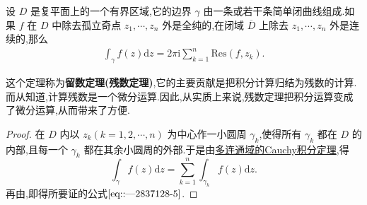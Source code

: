\documentclass[../../main.tex]{subfiles}
\begin{document}
\begin{theorem}\label{theorem:留数定理(残数定理)-定理5.4.9}
设 \( D \) 是复平面上的一个有界区域,它的边界 \( \gamma \) 由一条或若干条简单闭曲线组成.如果 \( f \) 在 \( D \) 中除去孤立奇点 \( z_1, \cdots, z_n \) 外是全纯的,在闭域 \( \overline{D} \) 上除去 \( z_1, \cdots, z_n \) 外是连续的,那么
\begin{align}
\int_{\gamma} f(z) \mathrm{d}z = 2\pi \mathrm{i} \sum_{k = 1}^{n} \mathrm{Res}(f, z_k).\label{eq::---2837128-5}
\end{align}
\end{theorem}
\begin{remark}
这个定理称为\textbf{留数定理(残数定理)},它的主要贡献是把积分计算归结为残数的计算.而从知道,计算残数是一个微分运算.因此,从实质上来说,残数定理把积分运算变成了微分运算,从而带来了方便.
\end{remark}
\begin{proof}
在 \( D \) 内以 \( z_k (k = 1, 2, \cdots, n) \) 为中心作一小圆周 \( \gamma_k \),使得所有 \( \gamma_k \) 都在 \( D \) 的内部,且每一个 \( \gamma_k \) 都在其余小圆周的外部.于是由\hyperref[theorem:定理3.2.5]{多连通域的Cauchy积分定理},得
\[
\int_{\gamma} f(z) \mathrm{d}z = \sum_{k = 1}^{n} \int_{\gamma_k} f(z) \mathrm{d}z.
\]
再由,即得所要证的公式\(\eqref{eq::---2837128-5}\).
\end{proof}
\end{document}
